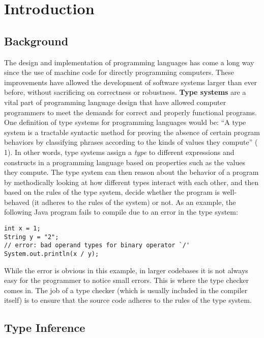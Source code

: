 \section{Introduction}

\subsection{Background}

The design and implementation of programming languages has come a long way since the use of machine code for directly programming computers. These improvements have allowed the development of software systems larger than ever before, without sacrificing on correctness or robustness. \textbf{Type systems} are a vital part of programming language design that have allowed computer programmers to meet the demands for correct and properly functional programs. One definition of type systems for programming languages would be: ``A type system is a tractable syntactic method for proving the absence of certain program behaviors by classifying phrases according to the kinds of values they compute'' (\cite{pierce} 1). In other words, type systems assign a \textit{type} to different expressions and constructs in a programming language based on properties such as the values they compute. The type system can then reason about the behavior of a program by methodically looking at how different types interact with each other, and then based on the rules of the type system, decide whether the program is well-behaved (it adheres to the rules of the system) or not. As an example, the following Java program fails to compile due to an error in the type system:

\begin{lstlisting}[label=lst:BadDiv,caption=Ill-behaved Java program]
int x = 1;
String y = "2";
// error: bad operand types for binary operator `/'
System.out.println(x / y);
\end{lstlisting}

While the error is obvious in this example, in larger codebases it is not always easy for the programmer to notice small errors. This is where the type checker comes in. The job of a type checker (which is usually included in the compiler itself) is to ensure that the source code adheres to the rules of the type system.

\subsection{Type Inference}

